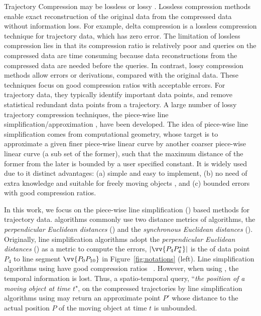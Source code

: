 Trajectory Compression may be lossless or lossy \cite{Muckell:Compression}.
%
Lossless compression methods enable exact reconstruction of the original data from the compressed data without information loss. For example, delta compression \cite{Nibali:Trajic} is a lossless compression technique for trajectory data, which has zero error.
The limitation of lossless compression lies in that its compression ratio is relatively poor \cite{Nibali:Trajic} and {queries on the compressed data are time consuming because data reconstructions from the compressed data are needed before the queries}.
%
In contrast, lossy compression methods allow errors or derivations, compared with the original data.
These techniques focus on good compression ratios with acceptable errors. For trajectory data, they typically identify important data points, and remove statistical redundant data points from a trajectory.
A large number of lossy trajectory compression techniques, \eg the piece-wise line {simplification/approximation} \cite{Douglas:Peucker, Hershberger:Speeding, Keogh:online,Liu:BQS, Muckell:Compression, Chen:Trajectory, Chen:Fast, Cao:Spatio, Shi:Survey}, have been developed.
The idea of piece-wise line simplification comes from computational geometry, whose target is to approximate a given finer piece-wise linear curve by another coarser piece-wise linear curve (a sub set of the former), such that the maximum distance of the former from the later is bounded by a user specified constant. 
It is widely used due to it distinct advantages: (a) simple and easy to implement, (b) no need of extra knowledge and suitable for freely  moving  objects \cite{Popa:Spatio}, and (c) bounded errors with good compression ratios.

In this work, we focus on the piece-wise line simplification (\lsa) based methods for trajectory data.
\lsa algorithms commonly use two distance metrics of \lsa algorithms, \ie the \emph{perpendicular Euclidean distances} (\ped) and the \emph{synchronous Euclidean distances} (\sed).
Originally, line simplification algorithms adopt the \emph{perpendicular Euclidean distances} (\ped) as a metric to compute the errors,
\eg $|\vv{P_4P^*_4}|$ is the \ped of data point $P_4$ to line segment $\vv{P_0P_{10}}$ in Figure~\ref{fig:notations} (left).
Line simplification algorithms using \ped have good compression ratios~ \cite{Douglas:Peucker, Hershberger:Speeding, Liu:BQS, Muckell:Compression, Chen:Trajectory, Cao:Spatio, Shi:Survey}.  However, when using \ped, the temporal information is lost. Thus, a spatio-temporal query, \eg ``\emph{the position of a moving object at time $t$}", on the compressed trajectories by line simplification algorithms using \ped may return an approximate point $P'$ whose distance to the actual position $P$ of the moving object at time $t$ is unbounded. %


